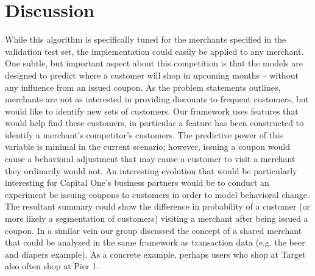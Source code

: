\documentclass[12pt]{article} %
\begin{document}
\section{Discussion}
While this algorithm is specifically tuned for the merchants specified in the validation test set, the implementation could easily be applied to any merchant.  One subtle, but important aspect about this competition is that the models are designed to predict where a customer will shop in upcoming months -- without any influence from an issued coupon.  As the problem statements outlines, merchants are not as interested in providing discounts to frequent customers, but would like to identify new sets of customers.  Our framework uses features that would help find these customers, in particular a feature has been constructed to identify a merchant's competitor's customers.  The predictive power of this variable is minimal in the current scenario; however, issuing a coupon would cause a behavioral adjustment that may cause a customer to visit a merchant they ordinarily would not.  An interesting evolution that would be particularly interesting for Capital One's business partners would be to conduct an experiment be issuing coupons to customers in order to model behavioral change.    The resultant summary could show the difference in probability of a customer (or more likely a segmentation of customers)  visiting a merchant after being issued a coupon.  In a similar vein our group discussed the concept of a shared merchant that could be analyzed in the same framework as transaction data (e.g. the beer and diapers example).  As a concrete example, perhaps users who shop at Target also often shop at Pier 1.
\end{document}
